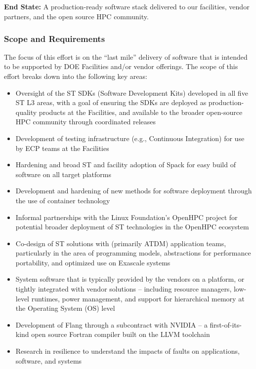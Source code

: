 \subsection{ \ecosystem}

\textbf{End State:} A production-ready software stack delivered to our facilities, vendor partners, and the open source HPC community.

\subsubsection{Scope and Requirements}
The focus of this effort is on the ``last mile'' delivery of software that is intended to be supported by DOE Facilities and/or vendor offerings. The scope of this effort breaks down into the following key areas:
\begin{itemize}
	\item Oversight of the ST SDKs (Software Development Kits) developed in all five ST L3 areas, with a goal of ensuring the SDKs are deployed as production-quality products at the Facilities, and available to the broader open-source HPC community through coordinated releases
	\item Development of testing infrastructure (e.g., Continuous Integration) for use by ECP teams at the Facilities
	\item Hardening and broad ST and facility adoption of Spack for easy build of software on all target platforms
	\item Development and hardening of new methods for software deployment through the use of container technology
	\item Informal partnerships with the Linux Foundation's OpenHPC project for potential broader deployment of ST technologies in the OpenHPC ecosystem
	\item Co-design of ST solutions with (primarily ATDM) application teams, particularly in the area of programming models, abstractions for performance portability, and optimized use on Exascale systems
	\item System software that is typically provided by the vendors on a platform, or tightly integrated with vendor solutions – including resource managers, low-level runtimes, power management, and support for hierarchical memory at the Operating System (OS) level
	\item Development of Flang through a subcontract with NVIDIA – a first-of-its-kind open source Fortran compiler built on the LLVM toolchain
	\item Research in resilience to understand the impacts of faults on applications, software, and systems
\end{itemize}
